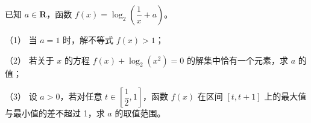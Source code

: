 \begin{question}
已知 \(a\in\mathbf R\)，函数 \(f(x)=\log_2\left(\dfrac1x+a\right)\)。

（1） 当 \(a=1\) 时，解不等式 \(f(x)>1\)；

（2） 若关于 \(x\) 的方程 \(f(x)+\log_2(x^2)=0\) 的解集中恰有一个元素，求 \(a\) 的值；

（3） 设 \(a>0\)，若对任意 \(t\in\left[\dfrac12,1\right]\)，函数 \(f(x)\) 在区间 \([t,t+1]\) 上的最大值与最小值的差不超过 1，求 \(a\) 的取值范围。

\end{question}